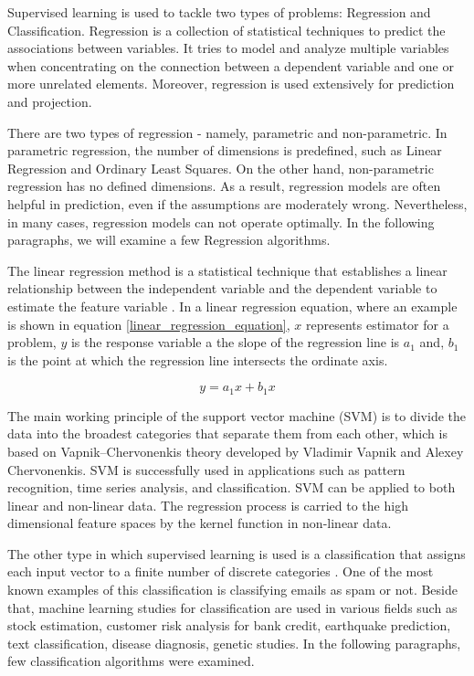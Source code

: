 Supervised learning is used to tackle two types of problems: Regression and Classification. Regression is a collection of statistical techniques to predict the associations between variables. It tries to model and analyze multiple variables when concentrating on the connection between a dependent variable and one or more unrelated elements. Moreover, regression is used extensively for prediction and projection.

There are two types of regression - namely, parametric and non-parametric. In parametric regression, the number of dimensions is predefined, such as Linear Regression and Ordinary Least Squares. On the other hand, non-parametric regression has no defined dimensions. As a result, regression models are often helpful in prediction, even if the assumptions are moderately wrong. Nevertheless, in many cases, regression models can not operate optimally. In the following paragraphs, we will examine a few Regression algorithms.

The linear regression method is a statistical technique that establishes a linear relationship between the independent variable and the dependent variable to estimate the feature variable \cite{tan2016introduction}. In a linear regression equation, where an example is shown in equation \ref{linear_regression_equation}, \(x\) represents estimator for a problem, \(y\) is the response variable a the slope of the regression line is \(a_1\) and, \(b_1\) is the point at which the regression line intersects the ordinate axis.

\begin{equation} \label{linear_regression_equation}
y = a_1x + b_1x
\end{equation}

The main working principle of the support vector machine (SVM) is to divide the data into the broadest categories that separate them from each other, which is based on Vapnik–Chervonenkis theory developed by Vladimir Vapnik and Alexey Chervonenkis. SVM is successfully used in applications such as pattern recognition, time series analysis, and classification. SVM can be applied to both linear and non-linear data. The regression process is carried to the high dimensional feature spaces by the kernel function in non-linear data.

The other type in which supervised learning is used is a classification that assigns each input vector to a finite number of discrete categories \cite{harrington2012machine}. One of the most known examples of this classification is classifying emails as spam or not. Beside that, machine learning studies for classification are used in various fields such as stock estimation, customer risk analysis for bank credit, earthquake prediction, text classification, disease diagnosis, genetic studies. In the following paragraphs, few classification algorithms were examined.

